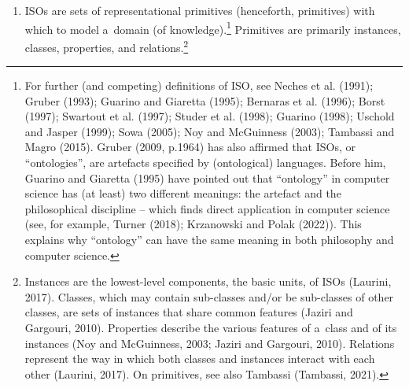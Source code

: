 \begin{enumerate}

\setcounter{enumi}{\value{saveenum}}

\item ISOs are sets of representational primitives (henceforth, primitives) with which to model a~domain (of knowledge).\footnote{\textrm{ For further (and competing) definitions of ISO, see Neches et al. }\label{ref:RNDs79Rw3smTh}\textrm{(1991)}\textrm{; Gruber }\label{ref:RNDulDWUalQHD}\textrm{(1993)}\textrm{; Guarino and Giaretta }\label{ref:RNDNc93EP1veQ}\textrm{(1995)}\textrm{; Bernaras et al. }\label{ref:RNDyJd8BX2iSu}\textrm{(1996)}\textrm{; Borst }\label{ref:RNDFOBsz9JegY}\textrm{(1997)}\textrm{; Swartout et al. }\label{ref:RNDZWeg7QpVjT}\textrm{(1997)}\textrm{; Studer et al. }\label{ref:RNDDSELqzHVKQ}\textrm{(1998)}\textrm{; Guarino }\label{ref:RNDUOi3fhFvwb}\textrm{(1998)}\textrm{; Uschold and Jasper }\label{ref:RNDtVnvyrP1Mw}\textrm{(1999)}\textrm{; Sowa }\label{ref:RNDkevWbfYmM7}\textrm{(2005)}\textrm{; Noy and McGuinness }\label{ref:RNDCZq17toNhF}\textrm{(2003)}\textrm{; Tambassi and Magro }\label{ref:RNDrJpx0AqoZM}\textrm{(2015)}\textrm{. Gruber }\label{ref:RNDciyDRYg1al}\textrm{(2009, p.1964)}\textrm{ has also affirmed that ISOs, or ``ontologies'', are artefacts specified by (ontological) languages. Before him, Guarino and Giaretta }\label{ref:RNDPAWMiYAUY8}\textrm{(1995)}\textrm{ have pointed out that ``ontology'' in computer science has (at least) two different meanings: the artefact and the philosophical discipline -- which finds direct application in computer science (see, for example, Turner }\label{ref:RNDEIxMrfnX5h}\textrm{(2018)}\textrm{; Krzanowski and Polak }\label{ref:RND4FPWHBdLXS}\textrm{(2022)}\textrm{). This explains why ``ontology'' can have the same meaning in both philosophy and computer science. }} Primitives are primarily instances, classes, properties, and relations.\footnote{\textrm{ Instances are the lowest-level components, the basic units, of ISOs }\label{ref:RNDdr97C4EV5N}\textrm{(Laurini, 2017)}\textrm{. Classes, which may contain sub-classes and/or be sub-classes of other classes, are sets of instances that share common features }\label{ref:RNDBg41DF7QTa}\textrm{(Jaziri and Gargouri, 2010)}\textrm{. Properties describe the various features of a~class and of its instances }\label{ref:RNDO5jcCKaTQ1}\textrm{(Noy and McGuinness, 2003; Jaziri and Gargouri, 2010)}\textrm{. Relations represent the way in which both classes and instances interact with each other }\label{ref:RNDhcWtvdFqLf}\textrm{(Laurini, 2017)}\textrm{. On primitives, see also Tambassi }\label{ref:RNDR0Py0GAbHa}\textrm{(Tambassi, 2021)}\textrm{.}}

\end{enumerate}


